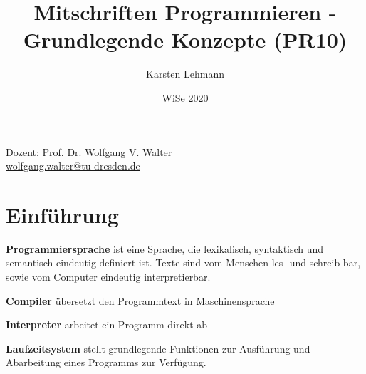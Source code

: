 \documentclass{article}
\author{Karsten Lehmann}
\date{WiSe 2020}
\title{Mitschriften Programmieren - Grundlegende Konzepte (PR10)}
\begin{document}
\maketitle

\vfill
\begin{center}
  Dozent: Prof. Dr. Wolfgang V. Walter \\
  \href{mailto:wolfgang.walter@tu-dresden.de}{wolfgang.walter@tu-dresden.de}
\end{center}

\newpage

\section{Einführung}


\noindent
\textbf{Programmiersprache} ist eine Sprache, die lexikalisch, syntaktisch und semantisch eindeutig definiert ist.
Texte sind vom Menschen les- und schreib-bar, sowie vom Computer eindeutig interpretierbar.

\noindent
\textbf{Compiler} übersetzt den Programmtext in Maschinensprache

\noindent
\textbf{Interpreter} arbeitet ein Programm direkt ab

\noindent
\textbf{Laufzeitsystem} stellt grundlegende Funktionen zur Ausführung und Abarbeitung eines Programms zur Verfügung.
\end{document}
